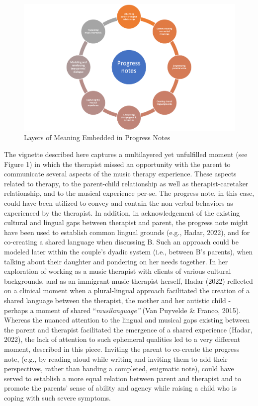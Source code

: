 \documentclass[authordate, empirical]{jote-new-article}
\begin{document}
    \begin{figure}[t]
        \begin{fullwidth}
            \centering
        \includegraphics[width=\textwidth]{media/Picture1.png}
        \caption{Layers of Meaning Embedded in Progress Notes}
        \end{fullwidth}
	\end{figure}

	The vignette described here captures a multilayered yet unfulfilled moment (see Figure 1) in which the therapist missed an opportunity with the parent to communicate several aspects of the music therapy experience. These aspects related to therapy, to the parent-child relationship as well as therapist-caretaker relationship, and to the musical experience per-se. The progress note, in this case, could have been utilized to convey and contain the non-verbal behaviors as experienced by the therapist. In addition, in acknowledgement of the existing cultural and lingual gaps between therapist and parent, the progress note might have been used to establish common lingual grounds (e.g., Hadar, 2022), and for co-creating a shared language when discussing B. Such an approach could be modeled later within the couple's dyadic system (i.e., between B's parents), when talking about their daughter and pondering on her needs together. In her exploration of working as a music therapist with clients of various cultural backgrounds, and as an immigrant music therapist herself, Hadar (2022) reflected on a clinical moment when a plural-lingual approach facilitated the creation of a shared language between the therapist, the mother and her autistic child - perhaps a moment of shared “\emph{musilanguage”} (Van Puyvelde \& Franco, 2015). Whereas the nuanced attention to the lingual and musical gaps existing between the parent and therapist facilitated the emergence of a shared experience (Hadar, 2022), the lack of attention to such ephemeral qualities led to a very different moment, described in this piece. Inviting the parent to co-create the progress note, (e.g., by reading aloud while writing and inviting them to add their perspectives, rather than handing a completed, enigmatic note), could have served to establish a more equal relation between parent and therapist and to promote the parents' sense of ability and agency while raising a child who is coping with such severe symptoms.
\end{document}
